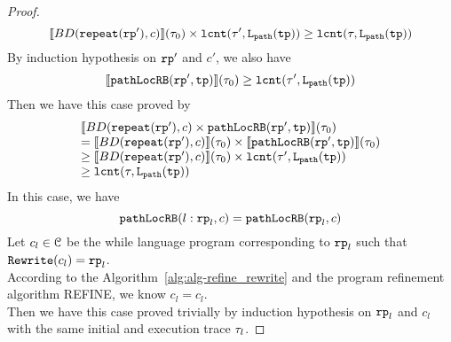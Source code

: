 \begin{proof}
\[
  \llbracket BD(\mathtt{repeat}(\mathtt{rp}'), c) \rrbracket(\mathtt{\tau}_0) \times \mathtt{lcnt}(\mathtt{\tau}', \mathtt{L}_{\mathtt{path}}(\mathtt{tp}))  
  \geq \mathtt{lcnt}(\mathtt{\tau}, \mathtt{L}_{\mathtt{path}}(\mathtt{tp})) 
\]
By induction hypothesis on $\mathtt{rp}'$ and $c'$, we also have
\[
  \llbracket \mathtt{pathLocRB}(\mathtt{rp}', \mathtt{tp}) \rrbracket(\mathtt{\tau}_0) \geq \mathtt{lcnt}(\mathtt{\tau}',  \mathtt{L}_{\mathtt{path}}(\mathtt{tp})) 
\]
Then we have this case proved by
\[
  \begin{array}{l}
  \llbracket BD(\mathtt{repeat}(\mathtt{rp}'), c) \times \mathtt{pathLocRB}(\mathtt{rp}', \mathtt{tp}) \rrbracket(\mathtt{\tau}_0) 
  \\
  =
  \llbracket BD(\mathtt{repeat}(\mathtt{rp}'), c) \rrbracket(\mathtt{\tau}_0) \times \llbracket \mathtt{pathLocRB}(\mathtt{rp}', \mathtt{tp}) \rrbracket(\mathtt{\tau}_0) 
  \\
  \geq \llbracket BD(\mathtt{repeat}(\mathtt{rp}'), c) \rrbracket(\mathtt{\tau}_0) \times \mathtt{lcnt}(\mathtt{\tau}',  \mathtt{L}_{\mathtt{path}}(\mathtt{tp}))  
  \\
  \geq \mathtt{lcnt}(\mathtt{\tau}, \mathtt{L}_{\mathtt{path}}(\mathtt{tp})) 
  \end{array}
  \]
  In this case, we have
  \[
    \mathtt{pathLocRB}(l: \mathtt{rp}_l, c) = \mathtt{pathLocRB}(\mathtt{rp}_l, c)
  \]
  Let $c_l \in \mathcal{C}$ be the while language program corresponding to $\mathtt{rp}_l$ such that $\mathtt{Rewrite}(c_l) = \mathtt{rp}_l$.
  \\
  According to the Algorithm~\ref{alg:alg-refine_rewrite} and the program refinement algorithm REFINE, we know
  $c_l = c_l$.
  \\
  Then we have this case proved trivially by induction hypothesis on $\mathtt{rp}_l$ and $c_l$ with the same initial and execution trace $\mathtt{\tau}_l$.


\end{proof}
